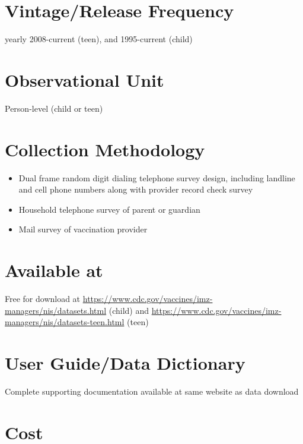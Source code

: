 \documentclass[
]{book}
\providecommand{\tightlist}{%
  \setlength{\itemsep}{0pt}\setlength{\parskip}{0pt}}
\begin{document}
\hypertarget{vintagerelease-frequency-53}{%
\section{Vintage/Release Frequency}\label{vintagerelease-frequency-53}}

yearly 2008-current (teen), and 1995-current (child)

\hypertarget{observational-unit-53}{%
\section{Observational Unit}\label{observational-unit-53}}

Person-level (child or teen)

\hypertarget{collection-methodology-53}{%
\section{Collection Methodology}\label{collection-methodology-53}}

\begin{itemize}
\tightlist
\item
  Dual frame random digit dialing telephone survey design, including landline and cell phone numbers along with provider record check survey
\item
  Household telephone survey of parent or guardian
\item
  Mail survey of vaccination provider
\end{itemize}

\hypertarget{available-at-53}{%
\section{Available at}\label{available-at-53}}

Free for download at \url{https://www.cdc.gov/vaccines/imz-managers/nis/datasets.html} (child) and \url{https://www.cdc.gov/vaccines/imz-managers/nis/datasets-teen.html} (teen)

\hypertarget{user-guidedata-dictionary-53}{%
\section{User Guide/Data Dictionary}\label{user-guidedata-dictionary-53}}

Complete supporting documentation available at same website as data download

\hypertarget{cost-53}{%
\section{Cost}\label{cost-53}}
\end{document}
